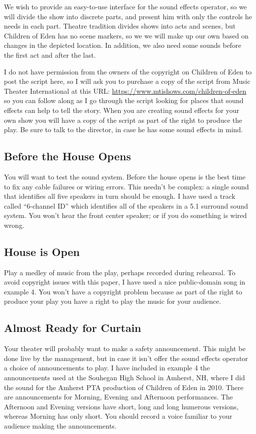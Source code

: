 \documentclass[letterpaper,twoside]{article}
\begin{document}
We wish to provide an easy-to-use interface for the sound effects
operator, so we will divide the show into discrete parts, and present
him with only the controls he needs in each part.  Theatre tradition
divides shows into acts and scenes, but Children of Eden has no scene
markers, so we we will make up our own based on changes in
the depicted location.
In addition, we also need some sounds before the first act and after the last.

I do not have permission from the owners of the copyright on
Children of Eden to post the script here, so I will ask you
to purchase a copy of the script from Music Theater International
at this URL: \url{https://www.mtishows.com/children-of-eden}
so you can follow along as I go through the script looking for
places that sound effects can help to tell the story.  When you are
creating sound effects for your own show you will have a copy of
the script as part of the right to produce the play.  Be sure to
talk to the director, in case he has some sound effects in mind.

\subsection{Before the House Opens}
You will want to test the sound system.  Before the house opens is the best
time to fix any cable failures or wiring errors.  This needn't be complex:
a single sound that identifies all five speakers in turn should be enough.
I have used a track called ``6-channel ID'' which identifies all of the
speakers in a 5.1 surround sound system.  You won't hear the front
center speaker; or if you do something is wired wrong.
\subsection{House is Open}
Play a medley of music from the play, perhaps recorded during rehearsal.
To avoid copyright issues with this paper, I have used a nice public-domain song
in example 4.  You won't have a copyright problem because as part of the right
to produce your play you have a right to play the music for your audience.
\subsection{Almost Ready for Curtain}
Your theater will probably want to make a safety announcement.
This might be done live by the management, but in case it isn't
offer the sound effects operator a choice of announcements
to play.  I have included in example 4 the announcements used at
the Souhegan High School in Amherst, NH, where I did the sound
for the Amherst PTA production of Children of Eden in 2010.
There are announcements for Morning, Evening and Afternoon
performances.  The Afternoon and Evening versions have
short, long and long humerous versions, whereas Morning
has only short.  You should record a voice familiar to your audience
making the announcements.
\end{document}
